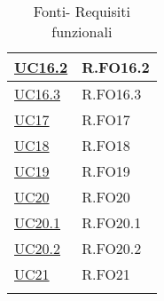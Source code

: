 \begin{longtable}{|P{4,5cm}|>{\arraybackslash}P{9cm}|}
  \hline
  \hyperref[UC16point2]{UC16.2} & R.FO16.2 \\
  \hline
  \hyperref[UC16point3]{UC16.3} & R.FO16.3 \\
  \hline
  \hyperref[UC17]{UC17} & R.FO17 \\
  \hline
  \hyperref[UC18]{UC18} & R.FO18 \\
  \hline
  \hyperref[UC19]{UC19} & R.FO19 \\
  \hline
  \hyperref[UC20]{UC20} & R.FO20 \\
  \hline
  \hyperref[UC20point1]{UC20.1} & R.FO20.1 \\
  \hline
  \hyperref[UC20point2]{UC20.2} & R.FO20.2 \\
  \hline
  \hyperref[UC21]{UC21} & R.FO21 \\
  \hline
\caption{Fonti- Requisiti funzionali}
\end{longtable}
